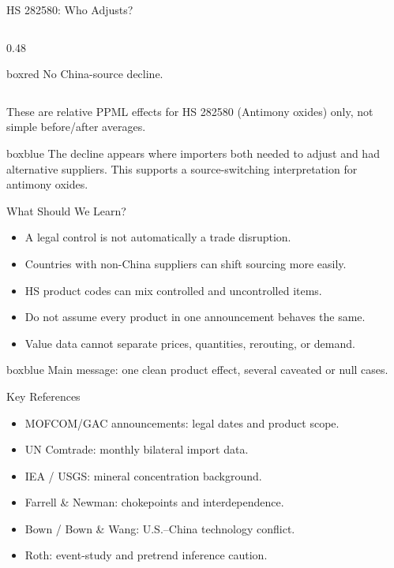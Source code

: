 \documentclass[aspectratio=169,11pt]{beamer}
\newcommand{\plainbox}[2]{%
  \begin{beamercolorbox}[rounded=true,sep=0.75em,wd=\textwidth]{#1}
    #2
  \end{beamercolorbox}
}
\begin{document}
\begin{frame}{HS 282580: Who Adjusts?}
\begin{columns}[T,totalwidth=\textwidth]
\begin{column}{0.48\textwidth}
\begin{beamercolorbox}[rounded=true,sep=0.42em,wd=\textwidth]{boxred}
        \vspace{0.04cm}
        \scriptsize No China-source decline.
      \end{beamercolorbox}
    \end{column}
  \end{columns}

  \vspace{0.06cm}
  \scriptsize These are relative PPML effects for HS 282580 (Antimony oxides) only, not simple before/after averages.

  \begin{beamercolorbox}[rounded=true,sep=0.35em,wd=\textwidth]{boxblue}
    \scriptsize The decline appears where importers both needed to adjust and had alternative suppliers. This supports a source-switching interpretation for antimony oxides.
  \end{beamercolorbox}
\end{frame}

\begin{frame}{What Should We Learn?}
  \large
  \begin{itemize}
    \item A legal control is not automatically a trade disruption.
    \item Countries with non-China suppliers can shift sourcing more easily.
    \item HS product codes can mix controlled and uncontrolled items.
    \item Do not assume every product in one announcement behaves the same.
    \item Value data cannot separate prices, quantities, rerouting, or demand.
  \end{itemize}

  \vfill
  \plainbox{boxblue}{\large Main message: one clean product effect, several caveated or null cases.}
\end{frame}

\appendix

\begin{frame}[noframenumbering]{Key References}
  \large
  \begin{itemize}
    \item MOFCOM/GAC announcements: legal dates and product scope.
    \item UN Comtrade: monthly bilateral import data.
    \item IEA / USGS: mineral concentration background.
    \item Farrell \& Newman: chokepoints and interdependence.
    \item Bown / Bown \& Wang: U.S.--China technology conflict.
    \item Roth: event-study and pretrend inference caution.
  \end{itemize}
\end{frame}
\end{document}
